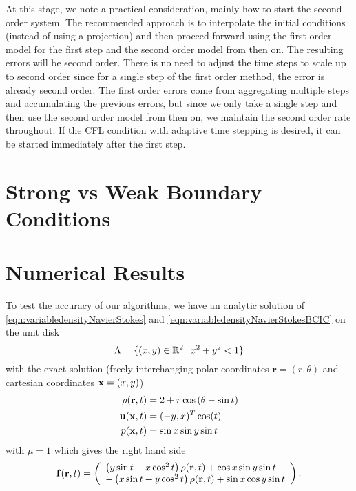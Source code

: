 \documentclass[letterpaper]{erdc}
\begin{document}
\begin{remark}
At this stage, we note a practical consideration, mainly how to start the second order system.  The recommended approach is to interpolate the initial conditions (instead of using a projection) and then proceed forward using the first order model for the first step and the second order model from then on.  The resulting errors will be second order.  There is no need to adjust the time steps to scale up to second order since for a single step of the first order method, the error is already second order.  The first order errors come from aggregating multiple steps and accumulating the previous errors, but since we only take a single step and then use the second order model from then on, we maintain the second order rate throughout.  If the CFL condition with adaptive time stepping is desired, it can be started immediately after the first step.
\end{remark}


%
%
%
\section{Strong vs Weak Boundary Conditions}



%
%
%
\section{Numerical Results}\label{sec:NumericalResults}

To test the accuracy of our algorithms, we have an analytic solution of \ref{eqn:variabledensityNavierStokes} and \ref{eqn:variabledensityNavierStokesBCIC} on the unit disk
\begin{equation}
  \Lambda = \{ (x,y) \in \mathbb{R}^{2} \:|\: x^2 + y^2 < 1 \}
\end{equation}
with the exact solution (freely interchanging polar coordinates $\mathbf{r} = (r,\theta)$ and cartesian coordinates $\textbf{x} = (x,y)$)
\begin{align}
  \rho(\mathbf{r},t) & = 2 + r\cos\left(\theta - \sin t  \right)\\
  \textbf{u}(\textbf{x},t) &= (-y, x)^T \cos(t)\\
  p(\textbf{x},t) &= \sin x \sin y \sin t
\end{align}
with $\mu = 1$ which gives the right hand side
\begin{equation}
  \mathbf{f}(\mathbf{r},t) = \left(\begin{array}{l} \left( y\sin t - x\cos^2 t\right)\rho(\mathbf{r},t) + \cos x \sin y \sin t\\ -\left(x \sin t + y\cos^2 t\right)\rho(\mathbf{r},t) + \sin x \cos y \sin t \end{array}\right).
\end{equation}
\end{document}
